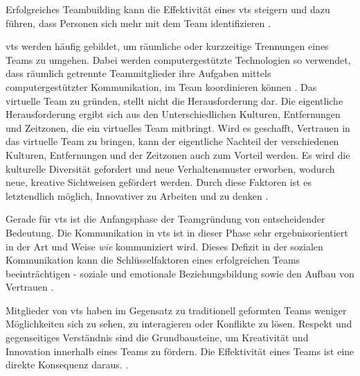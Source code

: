 \documentclass[a4paper,11pt]{article}%
\renewcommand{\\}{\vspace*{0.5\baselineskip} \newline}
\begin{document}
Erfolgreiches Teambuilding kann die Effektivität eines \ac{vts} steigern und dazu führen, dass Personen sich mehr mit dem Team identifizieren \citep{kaiser2000student}.

\ac{vts} werden häufig gebildet, um räumliche oder kurzzeitige Trennungen eines Teams zu umgehen. Dabei werden computergestützte Technologien so verwendet, dass räumlich getrennte Teammitglieder ihre Aufgaben mittels computergestützter Kommunikation, im Team koordinieren können \citep[p. 117-119]{peters2007identifying} \citep[p. 1-2]{cascio2003leadership}.
Das virtuelle Team zu gründen, stellt nicht die Herausforderung dar. Die eigentliche Herausforderung ergibt sich aus den Unterschiedlichen Kulturen, Entfernungen und Zeitzonen, die ein virtuelles Team mitbringt. Wird es geschafft, Vertrauen in das virtuelle Team zu bringen, kann der eigentliche Nachteil der verschiedenen Kulturen, Entfernungen und der Zeitzonen auch zum Vorteil werden. Es wird die kulturelle Diversität gefordert und neue Verhaltensmuster erworben, wodurch neue, kreative Sichtweisen gefördert werden. Durch diese Faktoren ist es letztendlich möglich, Innovativer zu Arbeiten und zu denken \citep{dyer1995team} \citep[p.405-416]{milliken1996searching}.


Gerade für \ac{vts} ist die Anfangsphase der Teamgründung von entscheidender Bedeutung. 
Die Kommunikation in \ac{vts} ist in dieser Phase sehr ergebnisorientiert in der Art und Weise \textit{wie} kommuniziert wird. Dieses Defizit in der sozialen Kommunikation kann die Schlüsselfaktoren eines erfolgreichen Teams beeinträchtigen - soziale und emotionale Beziehungsbildung sowie den Aufbau von Vertrauen \citep[p.378]{ren2007applying}.

Mitglieder von \ac{vts} haben im Gegensatz zu traditionell geformten Teams weniger Möglichkeiten sich zu sehen, zu interagieren oder Konflikte zu lösen. 
Respekt und gegenseitiges Verständnis sind die Grundbausteine, um Kreativität und Innovation innerhalb eines Teams zu fördern. Die Effektivität eines Teams ist eine direkte Konsequenz daraus. \citep[p.378]{ren2007applying}.
\end{document}
